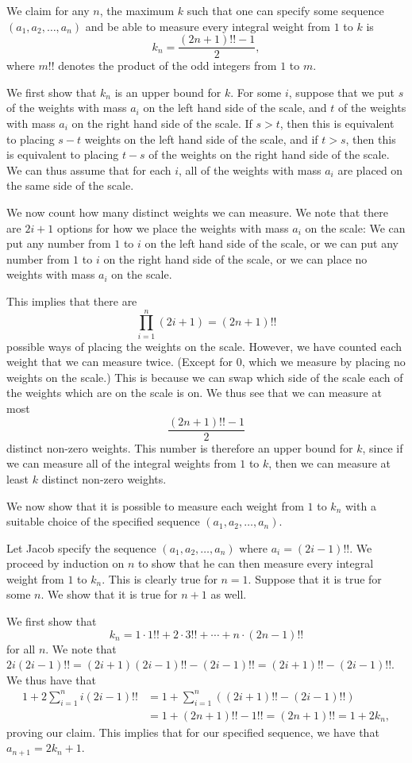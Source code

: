 \documentclass{article}
\begin{document}
\begin{enumerate}[1.]
We claim for any $n$, the maximum $k$ such that one can specify some sequence $(a_1, a_2, \dots, a_n)$ and be able to measure every integral weight from $1$ to $k$ is
\[
  k_n = \frac{(2n + 1)!! - 1}{2},
\]
where $m!!$ denotes the product of the odd integers from $1$ to $m$.

We first show that $k_n$ is an upper bound for $k$. For some $i$, suppose that we put $s$ of the weights with mass $a_i$ on the left hand side of the scale, and $t$ of the weights with mass $a_i$ on the right hand side of the scale. If $s > t$, then this is equivalent to placing $s - t$ weights on the left hand side of the scale, and if $t > s$, then this is equivalent to placing $t - s$ of the weights on the right hand side of the scale. We can thus assume that for each $i$, all of the weights with mass $a_i$ are placed on the same side of the scale.

We now count how many distinct weights we can measure. We note that there are $2i + 1$ options for how we place the weights with mass $a_i$ on the scale: We can put any number from $1$ to $i$ on the left hand side of the scale, or we can put any number from $1$ to $i$ on the right hand side of the scale, or we can place no weights with mass $a_i$ on the scale.

This implies that there are
\[
  \prod_{i = 1}^{n} (2i + 1) = (2n + 1)!!
\]
possible ways of placing the weights on the scale. However, we have counted each weight that we can measure twice. (Except for $0$, which we measure by placing no weights on the scale.) This is because we can swap which side of the scale each of the weights which are on the scale is on. We thus see that we can measure at most
\[
  \frac{(2n + 1)!! - 1}{2}
\]
distinct non-zero weights. This number is therefore an upper bound for $k$, since if we can measure all of the integral weights from $1$ to $k$, then we can measure at least $k$ distinct non-zero weights.

We now show that it is possible to measure each weight from $1$ to $k_n$ with a suitable choice of the specified sequence $(a_1, a_2, \dots, a_n)$.

Let Jacob specify the sequence $(a_1, a_2, \dots, a_n)$ where $a_i = (2i - 1)!!$. We proceed by induction on $n$ to show that he can then measure every integral weight from $1$ to $k_n$. This is clearly true for $n = 1$. Suppose that it is true for some $n$. We show that it is true for $n + 1$ as well.

We first show that
\[
  k_n = 1 \cdot 1!! + 2 \cdot 3!! + \cdots + n \cdot (2n - 1)!!
\]
for all $n$. We note that $2i (2i - 1)!! = (2i + 1) (2i - 1)!! - (2i - 1)!! = (2i + 1)!! - (2i - 1)!!$. We thus have that
\begin{align*}
  1 + 2 \sum_{i = 1}^{n} i (2i - 1)!! & = 1 + \sum_{i = 1}^{n} \left( (2i + 1)!! - (2i - 1)!! \right) \\ 
	& = 1 + (2n + 1)!! - 1!! = (2n + 1)!! = 1 + 2k_n,
\end{align*}
proving our claim. This implies that for our specified sequence, we have that $a_{n + 1} = 2k_n + 1$.


\end{enumerate}
\end{document}
